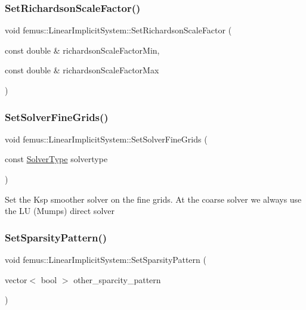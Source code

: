 \subsubsection{\texorpdfstring{Set\+Richardson\+Scale\+Factor()}{SetRichardsonScaleFactor()}\hspace{0.1cm}{\footnotesize\ttfamily [2/2]}}
{\footnotesize\ttfamily void femus\+::\+Linear\+Implicit\+System\+::\+Set\+Richardson\+Scale\+Factor (\begin{DoxyParamCaption}\item[{const double \&}]{richardson\+Scale\+Factor\+Min,  }\item[{const double \&}]{richardson\+Scale\+Factor\+Max }\end{DoxyParamCaption})\hspace{0.3cm}{\ttfamily [inline]}}

\mbox{\label{classfemus_1_1_linear_implicit_system_ae7ac45a0d0da811a3a444529e4676146}} 
\subsubsection{\texorpdfstring{Set\+Solver\+Fine\+Grids()}{SetSolverFineGrids()}}
{\footnotesize\ttfamily void femus\+::\+Linear\+Implicit\+System\+::\+Set\+Solver\+Fine\+Grids (\begin{DoxyParamCaption}\item[{const \mbox{\hyperlink{_solvertype_enum_8hpp_a8b06041d7c1fb05f379714f4312306ec}{Solver\+Type}}}]{solvertype }\end{DoxyParamCaption})}

Set the Ksp smoother solver on the fine grids. At the coarse solver we always use the LU (Mumps) direct solver \mbox{\label{classfemus_1_1_linear_implicit_system_a84e39c3271fda228ef71104000c2fd99}} 
\subsubsection{\texorpdfstring{Set\+Sparsity\+Pattern()}{SetSparsityPattern()}}
{\footnotesize\ttfamily void femus\+::\+Linear\+Implicit\+System\+::\+Set\+Sparsity\+Pattern (\begin{DoxyParamCaption}\item[{vector$<$ bool $>$}]{other\+\_\+sparcity\+\_\+pattern }\end{DoxyParamCaption})}

